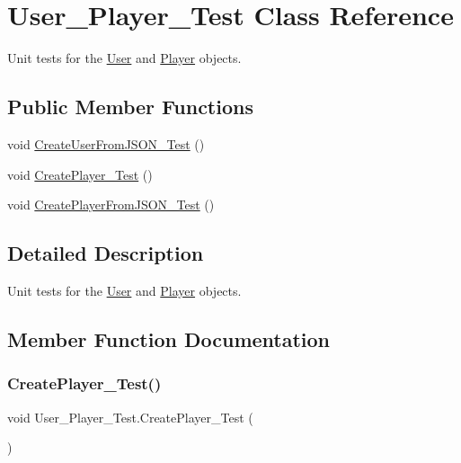 \hypertarget{class_user___player___test}{}\section{User\+\_\+\+Player\+\_\+\+Test Class Reference}
\label{class_user___player___test}


Unit tests for the \mbox{\hyperlink{class_user}{User}} and \mbox{\hyperlink{class_player}{Player}} objects.  


\subsection*{Public Member Functions}
\begin{DoxyCompactItemize}
\item 
void \mbox{\hyperlink{class_user___player___test_a45e8193156cae6d3615b54d257738662}{Create\+User\+From\+J\+S\+O\+N\+\_\+\+Test}} ()
\item 
void \mbox{\hyperlink{class_user___player___test_aa88269b78c5bd7f6140b20b14aa975a0}{Create\+Player\+\_\+\+Test}} ()
\item 
void \mbox{\hyperlink{class_user___player___test_a1b00d27b0e5bb67f63d0ee46ed39b0f0}{Create\+Player\+From\+J\+S\+O\+N\+\_\+\+Test}} ()
\end{DoxyCompactItemize}


\subsection{Detailed Description}
Unit tests for the \mbox{\hyperlink{class_user}{User}} and \mbox{\hyperlink{class_player}{Player}} objects. 

\subsection{Member Function Documentation}
\mbox{\label{class_user___player___test_aa88269b78c5bd7f6140b20b14aa975a0}} 
\subsubsection{\texorpdfstring{CreatePlayer\_Test()}{CreatePlayer\_Test()}}
{\footnotesize\ttfamily void User\+\_\+\+Player\+\_\+\+Test.\+Create\+Player\+\_\+\+Test (\begin{DoxyParamCaption}{ }\end{DoxyParamCaption})\hspace{0.3cm}{\ttfamily [inline]}}

